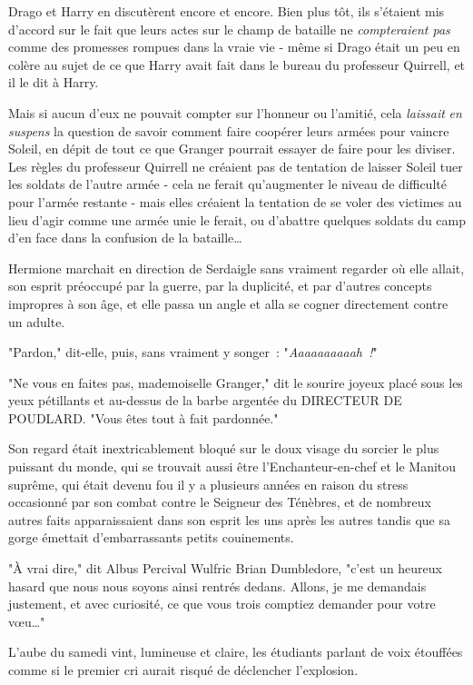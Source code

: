 Drago et Harry en discutèrent encore et encore. Bien plus tôt, ils s'étaient mis d'accord sur le fait que leurs actes sur le champ de bataille ne \emph{compteraient pas} comme des promesses rompues dans la vraie vie - même si Drago était un peu en colère au sujet de ce que Harry avait fait dans le bureau du professeur Quirrell, et il le dit à Harry.

Mais si aucun d'eux ne pouvait compter sur l'honneur ou l'amitié, cela \emph{laissait} \emph{en suspens} la question de savoir comment faire coopérer leurs armées pour vaincre Soleil, en dépit de tout ce que Granger pourrait essayer de faire pour les diviser. Les règles du professeur Quirrell ne créaient pas de tentation de laisser Soleil tuer les soldats de l'autre armée - cela ne ferait qu'augmenter le niveau de difficulté pour l'armée restante - mais elles créaient la tentation de se voler des victimes au lieu d'agir comme une armée unie le ferait, ou d'abattre quelques soldats du camp d'en face dans la confusion de la bataille…

\later

Hermione marchait en direction de Serdaigle sans vraiment regarder où elle allait, son esprit préoccupé par la guerre, par la duplicité, et par d'autres concepts impropres à son âge, et elle passa un angle et alla se cogner directement contre un adulte.

"Pardon," dit-elle, puis, sans vraiment y songer~: "\emph{Aaaaaaaaaah~!}"

"Ne vous en faites pas, mademoiselle Granger," dit le sourire joyeux placé sous les yeux pétillants et au-dessus de la barbe argentée du DIRECTEUR DE POUDLARD. "Vous êtes tout à fait pardonnée."

Son regard était inextricablement bloqué sur le doux visage du sorcier le plus puissant du monde, qui se trouvait aussi être l'Enchanteur-en-chef et le Manitou suprême, qui était devenu fou il y a plusieurs années en raison du stress occasionné par son combat contre le Seigneur des Ténèbres, et de nombreux autres faits apparaissaient dans son esprit les uns après les autres tandis que sa gorge émettait d'embarrassants petits couinements.

"À vrai dire," dit Albus Percival Wulfric Brian Dumbledore, "c'est un heureux hasard que nous nous soyons ainsi rentrés dedans. Allons, je me demandais justement, et avec curiosité, ce que vous trois comptiez demander pour votre vœu…"

\later

L'aube du samedi vint, lumineuse et claire, les étudiants parlant de voix étouffées comme si le premier cri aurait risqué de déclencher l'explosion.

